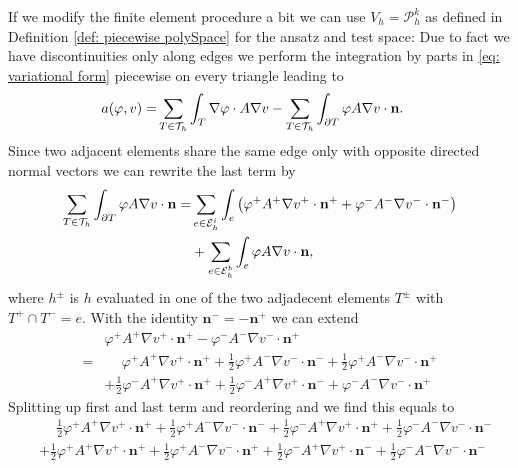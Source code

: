 \begin{definition} 
If we modify the finite element procedure a bit we can use $V_h = \mathcal P_h^k$ as defined in Definition \ref*{def: piecewise polySpace} for the ansatz and test space: Due to fact we have discontinuities only along edges we perform the integration by parts in \eqref{eq: variational form} piecewise on every triangle leading to
\begin{align}
	a(\varphi, v) = & \sum_{T \in \mathcal{T}_h} \int_T \nabla \varphi \cdot A \nabla v - \sum_{T \in \mathcal{T}_h} \int_{\partial T} \varphi A \nabla v \cdot \mathbf n.
\end{align}
Since two adjacent elements share the same edge only with opposite directed normal vectors we can rewrite the last term by
\begin{align*}
\sum\limits_{T \in \mathcal{T}_h}\int_{\partial T} \varphi A \nabla v \cdot \mathbf n 
= &\sum\limits_{e \in \mathcal{E}_h^i}\int_{e} \left( \varphi^+ A^+ \nabla v^+ \cdot \mathbf n^+ + \varphi^- A^- \nabla v^- \cdot \mathbf n^- \right) \\
& + \sum\limits_{e \in \mathcal{E}_h^b}\int_{e} \varphi A \nabla v \cdot \mathbf n,
\end{align*}
where $h^\pm $ is $h$ evaluated in one of the two adjadecent elements $T^\pm$ with $T^+ \cap T^- = e$. With the identity $\mathbf n^- = -\mathbf n^+$ we can extend
\begin{align*}
	&\varphi^+ A^+ \nabla v^+ \cdot \mathbf n^+ - \varphi^- A^- \nabla v^- \cdot \mathbf n^+ \\
		= & \phantom{+} \varphi^+ A^+ \nabla v^+ \cdot \mathbf n^+ 
		     + \frac 1 2  \varphi^+ A^- \nabla v^- \cdot \mathbf n^- + \frac 1 2 \varphi^+ A^- \nabla v^- \cdot \mathbf n^+ \\
		& + \frac 1 2  \varphi^- A^+ \nabla v^+ \cdot \mathbf n^+ + \frac 1 2 \varphi^- A^+ \nabla v^+ \cdot \mathbf n^-
		   + \varphi^- A^- \nabla v^- \cdot \mathbf n^+
\end{align*}
Splitting up first and last term and reordering and we find this equals to
\begin{align*}
		 & \phantom{+} \frac 1 2 \varphi^+ A^+ \nabla v^+ \cdot \mathbf n^+ 
		     + \frac 1 2  \varphi^+ A^- \nabla v^- \cdot \mathbf n^- + \frac 1 2  \varphi^- A^+ \nabla v^+ \cdot \mathbf n^+ + \frac 1 2 \varphi^- A^- \nabla v^- \cdot \mathbf n^- \\
		& + \frac 1 2  \varphi^+ A^+ \nabla v^+ \cdot \mathbf n^+  + \frac 1 2 \varphi^+ A^- \nabla v^- \cdot \mathbf n^+ +\frac 1 2 \varphi^- A^+ \nabla v^+ \cdot \mathbf n^- + \frac 1 2 \varphi^- A^- \nabla v^- \cdot \mathbf n^-\\

\end{align*}
\end{definition}
